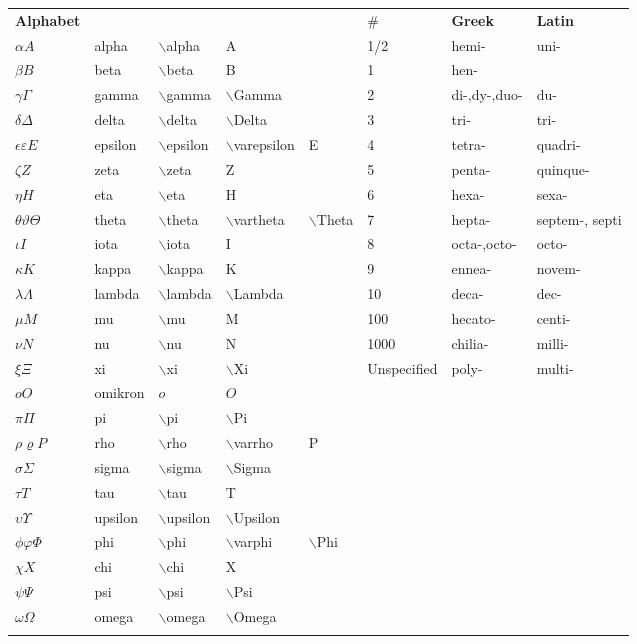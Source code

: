 \documentclass[10pt]{article}
\begin{document}
\begin{tabular}{p{1.5cm} p{1.5cm} p{1.5cm} p{1.5cm} p{2cm} p{1.8cm} p{1.8cm}  p{1.5cm}}
\bf{Alphabet} &  &  &  &  & \# & \bf{Greek} & \bf{Latin} \\

$\alpha A$ & alpha & $\backslash$alpha & A &  & 1/2 & hemi- & uni- \\
$\beta B$ & beta & $\backslash$beta   & B &  & 1 & hen-  \\
$\gamma \Gamma$ & gamma & $\backslash$gamma & $\backslash$Gamma &  & 2 & di-,dy-,duo- & du- \\
$\delta \Delta$ & delta & $\backslash$delta & $\backslash$Delta &  & 3 & tri- &tri-\\
$\epsilon \varepsilon E$ & epsilon & $\backslash$epsilon & $\backslash$varepsilon & E   & 4 & tetra- & quadri- \\
$\zeta Z$ & zeta & $\backslash$zeta & Z &   & 5 & penta- & quinque-\\
$\eta H$ & eta & $\backslash$eta & H &   & 6 & hexa- &sexa-\\
$\theta \vartheta \Theta$ & theta & $\backslash$theta & $\backslash$vartheta & $\backslash$Theta   & 7 & hepta- & septem-, septi\\
$\iota I$ & iota & $\backslash$iota & I &   & 8 & octa-,octo- & octo-\\
$\kappa K$ & kappa & $\backslash$kappa & K &   & 9 & ennea- & novem- \\
$\lambda \Lambda $ & lambda & $\backslash$lambda & $\backslash$Lambda &   & 10 & deca- & dec-\\
$\mu M $ & mu & $\backslash$mu & M &   & 100 & hecato- & centi- \\
$\nu N $ & nu & $\backslash$nu & N &   &  1000  & chilia- & milli-\\
$\xi \Xi $ & xi & $\backslash$xi & $\backslash$Xi &   & Unspecified & poly- & multi-\\
$o O $ & omikron & $o$ & $O$ &   &   \\
$\pi \Pi $ & pi & $\backslash$pi & $\backslash$Pi &   &   &\\
$\rho \varrho P $ & rho & $\backslash$rho & $\backslash$varrho & P   &   &\\
$\sigma \Sigma $ & sigma & $\backslash$sigma & $\backslash$Sigma &   &   &\\
$\tau T $ & tau & $\backslash$tau & T & & \\
$\upsilon \Upsilon $ & upsilon & $\backslash$upsilon & $\backslash$Upsilon & &\\
$\phi \varphi \Phi $ & phi & $\backslash$phi & $\backslash$varphi & $\backslash$Phi &\\
$\chi X$ & chi & $\backslash$chi & X & &\\
$\psi \Psi $ & psi & $\backslash$psi & $\backslash$Psi & &\\
$\omega \Omega $ & omega & $\backslash$omega & $\backslash$Omega & &\\\\
\end{tabular}
\\\\
\end{document}
